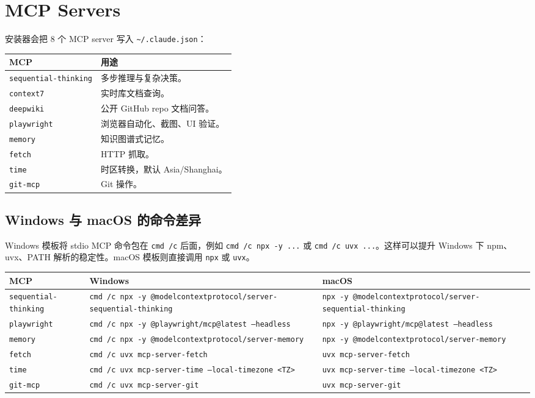 \documentclass[11pt,a4paper]{ctexbook}
\begin{document}
\chapter{MCP Servers}

安装器会把 8 个 MCP server 写入 \texttt{\textasciitilde/.claude.json}：

\begin{longtable}{p{}p{}}
\toprule
MCP & 用途 \\
\midrule
\texttt{sequential-thinking} & 多步推理与复杂决策。 \\
\texttt{context7} & 实时库文档查询。 \\
\texttt{deepwiki} & 公开 GitHub repo 文档问答。 \\
\texttt{playwright} & 浏览器自动化、截图、UI 验证。 \\
\texttt{memory} & 知识图谱式记忆。 \\
\texttt{fetch} & HTTP 抓取。 \\
\texttt{time} & 时区转换，默认 Asia/Shanghai。 \\
\texttt{git-mcp} & Git 操作。 \\
\bottomrule
\end{longtable}

\section{Windows 与 macOS 的命令差异}

Windows 模板将 stdio MCP 命令包在 \texttt{cmd /c} 后面，例如 \texttt{cmd /c npx -y ...} 或 \texttt{cmd /c uvx ...}。这样可以提升 Windows 下 npm、uvx、PATH 解析的稳定性。macOS 模板则直接调用 \texttt{npx} 或 \texttt{uvx}。

\begin{longtable}{p{}p{}p{}}
\toprule
MCP & Windows & macOS \\
\midrule
\texttt{sequential-thinking} & \texttt{cmd /c npx -y @modelcontextprotocol/server-sequential-thinking} & \texttt{npx -y @modelcontextprotocol/server-sequential-thinking} \\
\texttt{playwright} & \texttt{cmd /c npx -y @playwright/mcp@latest --headless} & \texttt{npx -y @playwright/mcp@latest --headless} \\
\texttt{memory} & \texttt{cmd /c npx -y @modelcontextprotocol/server-memory} & \texttt{npx -y @modelcontextprotocol/server-memory} \\
\texttt{fetch} & \texttt{cmd /c uvx mcp-server-fetch} & \texttt{uvx mcp-server-fetch} \\
\texttt{time} & \texttt{cmd /c uvx mcp-server-time --local-timezone <TZ>} & \texttt{uvx mcp-server-time --local-timezone <TZ>} \\
\texttt{git-mcp} & \texttt{cmd /c uvx mcp-server-git} & \texttt{uvx mcp-server-git} \\
\bottomrule
\end{longtable}
\end{document}
